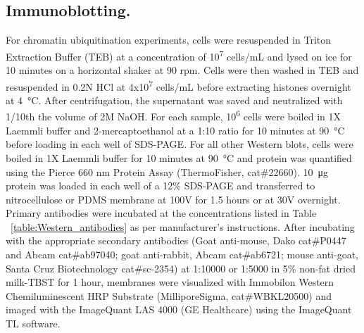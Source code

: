 \subsection{Immunoblotting.}
For chromatin ubiquitination experiments, cells were resuspended in Triton Extraction Buffer (TEB) at a concentration of 10\textsuperscript{7} cells/mL and lysed on ice for 10 minutes on a horizontal shaker at 90 rpm. Cells were then washed in TEB and resuspended in 0.2N HCl at 4x10\textsuperscript{7} cells/mL before extracting histones overnight at \SI{4}{\celsius}. After centrifugation, the supernatant was saved and neutralized with 1/10th the volume of 2M NaOH. For each sample, 10\textsuperscript{6} cells were boiled in 1X Laemmli buffer and 2-mercaptoethanol at a 1:10 ratio for 10 minutes at \SI{90}{\celsius} before loading in each well of SDS-PAGE. For all other Western blots, cells were boiled in 1X Laemmli buffer for 10 minutes at \SI{90}{\celsius} and protein was quantified using the Pierce 660 nm Protein Assay (ThermoFisher, cat\#22660). \SI{10}{\micro\gram} protein was loaded in each well of a 12\% SDS-PAGE and transferred to nitrocellulose or PDMS membrane at 100V for 1.5 hours or at 30V overnight. Primary antibodies were incubated at the concentrations listed in Table ~\ref{table:Western_antibodies} as per manufacturer's instructions. After incubating with the appropriate secondary antibodies (Goat anti-mouse, Dako cat\#P0447 and Abcam cat\#ab97040; goat anti-rabbit, Abcam cat\#ab6721; mouse anti-goat, Santa Cruz Biotechnology cat\#sc-2354) at 1:10000 or 1:5000 in 5\% non-fat dried milk-TBST for 1 hour, membranes were visualized with Immobilon Western Chemiluminescent HRP Substrate (MilliporeSigma, cat\#WBKL20500) and imaged with the ImageQuant LAS 4000 (GE Healthcare) using the ImageQuant TL software. 

